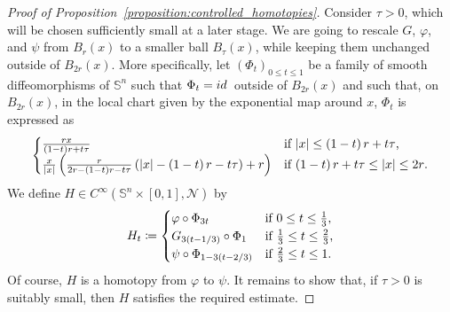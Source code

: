 \documentclass[10pt,a4paper]{amsart}
\def\S{{\mathbb S}}
\newcommand{\abs}[1]{\left |#1 \right |}
\newcommand{\brac}[1]{\left (#1 \right )}
\def\id{{\rm id\, }}
\def\n{{\mathcal N}}
\begin{document}
\begin{proof}[Proof of Proposition~\ref{proposition:controlled_homotopies}]
	Consider $ \tau > 0 $, which will be chosen sufficiently small at a later stage.
	We are going to rescale $ G $, $ \varphi $, and $ \psi $ from $ B_r(x)  $ to a smaller ball $ B_\tau(x) $, while keeping them unchanged outside of $ B_{2r}(x) $.
	More specifically, let $ \brac{\Phi_{t}}_{0 \leq t \leq 1} $ be a family of smooth diffeomorphisms of $ \S^n $ such that $ \Phi_{t} = \id $ outside of $ B_{2r}(x) $ and such that, on $ B_{2r}(x) $, in the local chart given by the exponential map around $ x $, $ \Phi_{t} $ is expressed as
	\[
		\begin{cases}
			\frac{rx}{\brac{1-t}r+t\tau} & \text{if $ \abs{x} \leq \brac{1-t}r+t\tau $,} \\
			\frac{x}{\abs{x}}\brac{\frac{r}{2r-\brac{1-t}r-t\tau}\brac{\abs{x}-\brac{1-t}r-t\tau}+r} & \text{if $ \brac{1-t}r+t\tau \leq \abs{x} \leq 2r $.}
		\end{cases}
	\]
	We define $ H \in C^{\infty}(\S^n\times[0,1],\n)$ by
	\[
		H_{t} \coloneqq
		\begin{cases}
			\varphi \circ \Phi_{3t} & \text{if $ 0 \leq t \leq \frac{1}{3} $,} \\
			G_{3\brac{t-1/3}} \circ \Phi_{1} & \text{if $ \frac{1}{3} \leq t \leq \frac{2}{3} $,} \\
			\psi \circ \Phi_{1-3\brac{t-2/3}} & \text{if $ \frac{2}{3} \leq t \leq 1$.}
		\end{cases}
	\]
	Of course, $ H $ is a homotopy from $ \varphi $ to $ \psi $.
	It remains to show that, if $ \tau > 0 $ is suitably small, then $ H $ satisfies the required estimate.


\end{proof}
\end{document}
